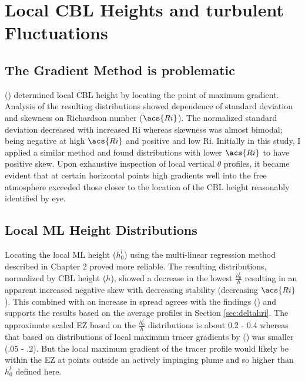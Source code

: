 
\section{Local \acs{CBL} Heights and turbulent Fluctuations}

\subsection{The Gradient Method is problematic}

\citeauthor{SullMoengStev} (\citeyear{SullMoengStev}) determined local \acs{CBL} height by locating the point of maximum gradient.  Analysis of the resulting distributions showed dependence of standard deviation and skewness on Richardson number ($\acs{Ri}$).  The normalized standard deviation decreased with increased \acs{Ri} whereas skewness was almost bimodal; being negative at high $\acs{Ri}$ and positive and low \acs{Ri}.  Initially in this study, I applied a similar method and found distributions with lower $\acs{Ri}$ to have positive skew.  Upon exhaustive inspection of local vertical $\theta$  profiles, it became evident that at certain horizontal points high gradients well into the free atmosphere exceeded those closer to the location of the \acs{CBL} height reasonably identified by eye.\\

\subsection{Local \acs{ML} Height Distributions}

Locating the local \acs{ML} height ($h^{l}_{0}$) using the multi-linear regression method described in Chapter 2 proved more reliable.  The resulting distributions, normalized by \acs{CBL} height ($h$),  showed a decrease in the lowest $\frac{h^{l}_{0}}{h}$ resulting in an apparent increased negative skew with decreasing stability (decreasing $\acs{Ri}$). This combined with an increase in spread agrees with the findings \citeauthor{SullMoengStev} (\citeyear{SullMoengStev}) and supports the results based on the average profiles in Section \ref{sec:deltahri}.  The approximate scaled \acs{EZ} based on the $\frac{h^{l}_{0}}{h}$ distributions is about 0.2 - 0.4 whereas that based on distributions of local maximum tracer gradients by  \citeauthor{BrooksFowler2} (\citeyear{BrooksFowler2}) was smaller (.05 - .2).  But the local maximum gradient of the tracer profile would likely be within the \acs{EZ} at points outside an actively impinging plume and so higher than $h^{l}_{0}$ defined here. \\  

